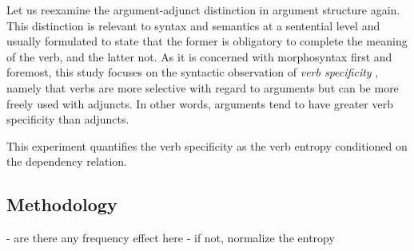 Let us reexamine the argument-adjunct distinction in argument structure again. This distinction is relevant to syntax and semantics at a sentential level and usually formulated to state that the former is obligatory to complete the meaning of the verb, and the latter not. As it is concerned with morphosyntax first and foremost, this study focuses on the syntactic observation of \textit{verb specificity} \citep[cf.]{haspelmath2015a}, namely that verbs are more selective with regard to arguments but can be more freely used with adjuncts. In other words, arguments tend to have greater verb specificity than adjuncts. 

This experiment quantifies the verb specificity as the verb entropy conditioned on the dependency relation.






\subsection{Methodology}

- are there any frequency effect here
- if not, normalize the entropy 

